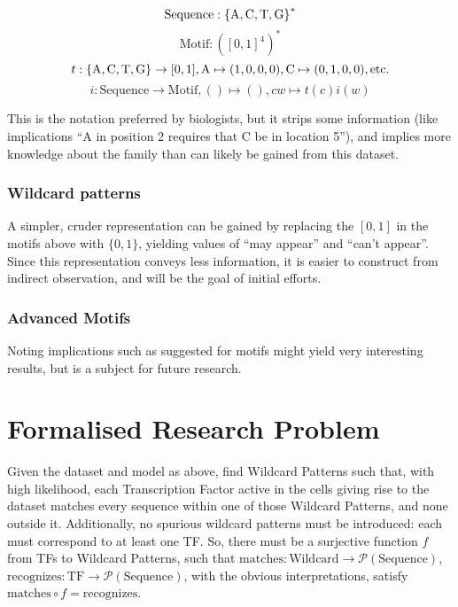 \documentclass[fleqn]{book}
\begin{document}
\[\text{Sequence} : \left \{ \text A, \text C, \text T, \text G \right \}^*\]
\[\text{Motif} : \left( [0,1]^4 \right)^*\]
\[t : \{ \text A, \text C, \text T, \text G \} \rightarrow [0,1], \text A \mapsto (1,0,0,0), \text C \mapsto (0,1,0,0), \text{etc.}\]
\[i : \text{Sequence} \rightarrow \text{Motif}, () \mapsto (), cw \mapsto t(c) i(w)\]

This is the notation preferred by biologists, but it strips some
information (like implications ``A in position 2 requires that C be in
location 5''), and implies more knowledge about the family than can
likely be gained from this dataset.

\subsection{Wildcard patterns}\label{wildcard-patterns}

A simpler, cruder representation can be gained by replacing the
\([0,1]\) in the motifs above with \(\{0,1\}\), yielding values of ``may
appear'' and ``can't appear''. Since this representation conveys less
information, it is easier to construct from indirect observation, and
will be the goal of initial efforts.

\subsection{Advanced Motifs}\label{advanced-motifs}

Noting implications such as suggested for motifs might yield very
interesting results, but is a subject for future research.

\chapter{Formalised Research Problem}\label{formalised-research-problem}

Given the dataset and model as above, find Wildcard Patterns such that,
with high likelihood, each Transcription Factor active in the cells
giving rise to the dataset matches every sequence within one of those
Wildcard Patterns, and none outside it. Additionally, no spurious
wildcard patterns must be introduced: each must correspond to at least
one TF. So, there must be a surjective function \(f\) from TFs to
Wildcard Patterns, such that
\(\text{matches}: \text{Wildcard} \rightarrow \mathcal{P}(\text{Sequence})\),
\(\text{recognizes}: \text{TF} \rightarrow \mathcal{P}(\text{Sequence})\),
with the obvious interpretations, satisfy
\(\text{matches} \circ f = \text{recognizes}\).
\end{document}
